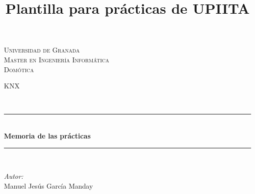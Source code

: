 \documentclass[10pt]{article}
\title{Plantilla para prácticas de UPIITA}
\begin{document}
\begin{center}																		%
\newcommand{\HRule}{\rule{\linewidth}{0.5mm}}									%
\begin{minipage}{0.48\textwidth} \begin{flushleft}
\end{flushleft}\end{minipage}
\begin{minipage}{0.48\textwidth} \begin{flushright}
\end{flushright}\end{minipage}

\vspace*{0.25cm}								%
\textsc{\huge Universidad de Granada}\\[1.5cm]	

\textsc{\LARGE Master en Ingeniería Informática}\\[1.5cm]													%

\textsc{\LARGE Domótica}\\[1.5cm]													%

\begin{minipage}{0.9\textwidth} 
\begin{center}																					%
\textsc{\LARGE KNX}
\end{center}
\end{minipage}\\[0.5cm]
 			\vspace*{1cm}																		%
\HRule \\[0.4cm]																	%
{ \huge \bfseries Memoria de las prácticas}\\[0.4cm]	%
\HRule \\[1.5cm]																	%
\begin{minipage}{0.46\textwidth}													%
\begin{flushleft} \large															%
\emph{Autor:}\\	
 Manuel Jesús García Manday
\end{flushleft}																		%
\end{minipage}		
\begin{minipage}{0.52\textwidth}		
\vspace{-0.6cm}											%
\begin{flushright} \large															%
\end{flushright}																	%
\end{minipage}	
\vspace*{1cm}
 	

\end{center}
\end{document}
